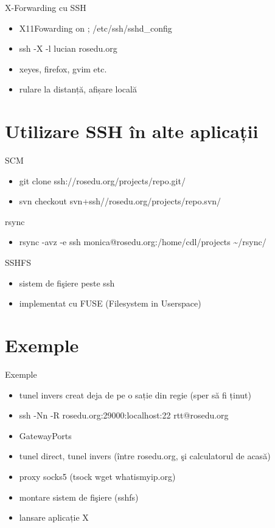 \documentclass{beamer}
\begin{document}
\begin{frame}{X-Forwarding cu SSH}
  \begin{itemize}
    \item X11Fowarding on ; /etc/ssh/sshd\_config
    \item ssh -X -l lucian rosedu.org
    \item xeyes, firefox, gvim etc.
    \item rulare la distanță, afișare locală
  \end{itemize}
\end{frame}

\section{Utilizare SSH \^{i}n alte aplicații}
\frame{\tableofcontents[currentsection]}

\begin{frame}{SCM}
  \begin{itemize}
    \item git clone ssh://rosedu.org/projects/repo.git/
    \item svn checkout svn+ssh//rosedu.org/projects/repo.svn/
  \end{itemize}
\end{frame}

\begin{frame}{rsync}
  \begin{itemize}
    \item rsync -avz -e ssh monica@rosedu.org:/home/cdl/projects
\~{}/rsync/
  \end{itemize}
\end{frame}

\begin{frame}{SSHFS}
	\begin{itemize}
	\item sistem de fişiere peste ssh
	\item implementat cu FUSE (Filesystem in Userspace)
	\end{itemize}
\end{frame}

\section{Exemple}
\frame{\tableofcontents[currentsection]}
\begin{frame}{Exemple}
	\begin{itemize}
	\item tunel invers creat deja de pe o sație din regie (sper să fi ținut) 
	\item ssh -Nn -R rosedu.org:29000:localhost:22 rtt@rosedu.org
	\item GatewayPorts
	\item tunel direct, tunel invers (între rosedu.org, şi calculatorul de
	acasă)
	\item proxy socks5	(tsock wget whatismyip.org)
	\item montare sistem de fişiere (sshfs)
	\item lansare aplicație X
	\end{itemize}
\end{frame}
\end{document}
